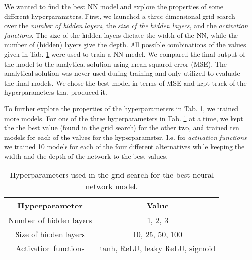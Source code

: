 We wanted to find the best NN model and explore the properties of some different hyperparameters. 
First, we launched a three-dimensional grid search over the \textit{number of hidden layers}, the \textit{size of the hidden layers}, and the \textit{activation functions}. 
The size of the hidden layers dictate the width of the NN, while the number of (hidden) layers give the depth. 
All possible combinations of the values given in Tab. \ref{tab:hyperparams} were used to train a NN model. 
We compared the final output of the model to the analytical solution using mean squared error (MSE). 
The analytical solution was never used during training and only utilized to evaluate the final models. 
We chose the best model in terms of MSE and kept track of the hyperparameters that produced it. 

To further explore the properties of the hyperparameters in Tab. \ref{tab:hyperparams}, we trained more models. 
For one of the three hyperparameters in Tab. \ref{tab:hyperparams} at a time, we kept the the best value (found in the grid search) for the other two, and trained ten models for each of the values for the hyperparameter. 
I.e. for \textit{activation functions} we trained 10 models for each of the four different alternatives while keeping the width and the depth of the network to the best values. 


\begin{table}[h!]
    \centering
    \begin{tabular}{|c|c|}
    \hline
        \textbf{Hyperparameter} & \textbf{Value}  \\ \hline
        Number of hidden layers & 1, 2, 3  \\ \hline
        Size of hidden layers & 10, 25, 50, 100 \\\hline
        Activation functions & tanh, ReLU, leaky ReLU, sigmoid \\ \hline
    \end{tabular}
    \caption{Hyperparameters used in the grid search for the best neural network model.}
    \label{tab:hyperparams}
\end{table}

